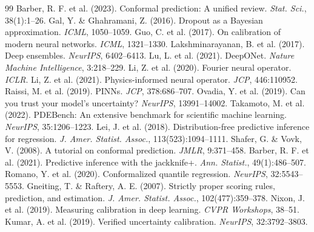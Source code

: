 \documentclass[12pt,a4paper]{article}
\theoremstyle{plain}
\begin{document}
\clearpage
\begin{thebibliography}{99}
     Barber, R. F. et al. (2023). Conformal prediction: A unified review. \textit{Stat. Sci.}, 38(1):1--26.
     Gal, Y. \& Ghahramani, Z. (2016). Dropout as a Bayesian approximation. \textit{ICML}, 1050--1059.
     Guo, C. et al. (2017). On calibration of modern neural networks. \textit{ICML}, 1321--1330.
     Lakshminarayanan, B. et al. (2017). Deep ensembles. \textit{NeurIPS}, 6402--6413.
     Lu, L. et al. (2021). DeepONet. \textit{Nature Machine Intelligence}, 3:218--229.
     Li, Z. et al. (2020). Fourier neural operator. \textit{ICLR}.
     Li, Z. et al. (2021). Physics-informed neural operator. \textit{JCP}, 446:110952.
     Raissi, M. et al. (2019). PINNs. \textit{JCP}, 378:686--707.
     Ovadia, Y. et al. (2019). Can you trust your model's uncertainty? \textit{NeurIPS}, 13991--14002.
     Takamoto, M. et al. (2022). PDEBench: An extensive benchmark for scientific machine learning. \textit{NeurIPS}, 35:1206--1223.
     Lei, J. et al. (2018). Distribution-free predictive inference for regression. \textit{J. Amer. Statist. Assoc.}, 113(523):1094--1111.
     Shafer, G. \& Vovk, V. (2008). A tutorial on conformal prediction. \textit{JMLR}, 9:371--458.
     Barber, R. F. et al. (2021). Predictive inference with the jackknife+. \textit{Ann. Statist.}, 49(1):486--507.
     Romano, Y. et al. (2020). Conformalized quantile regression. \textit{NeurIPS}, 32:5543--5553.
     Gneiting, T. \& Raftery, A. E. (2007). Strictly proper scoring rules, prediction, and estimation. \textit{J. Amer. Statist. Assoc.}, 102(477):359--378.
     Nixon, J. et al. (2019). Measuring calibration in deep learning. \textit{CVPR Workshops}, 38--51.
     Kumar, A. et al. (2019). Verified uncertainty calibration. \textit{NeurIPS}, 32:3792--3803.

\end{thebibliography}
\end{document}
